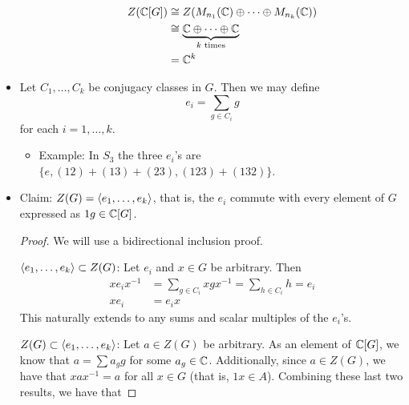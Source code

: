 \documentclass[../notes.tex]{subfiles}
\begin{document}
\begin{itemize}
\begin{itemize}
\begin{align*}
            Z(\mathbb{C}[G]) &\cong Z(M_{n_1}(\mathbb{C})\oplus\cdots\oplus M_{n_k}(\mathbb{C}))\\
            &\cong \underbrace{\mathbb{C}\oplus\cdots\oplus\mathbb{C}}_{k\text{ times}}\\
            &= \mathbb{C}^k
        \end{align*}
    \end{itemize}
    \item Let $C_1,\dots,C_k$ be conjugacy classes in $G$. Then we may define
    \begin{equation*}
        e_i = \sum_{g\in C_i}g
    \end{equation*}
    for each $i=1,\dots,k$.
    \begin{itemize}
        \item Example: In $S_3$ the three $e_i$'s are $\{e,(12)+(13)+(23),(123)+(132)\}$.
    \end{itemize}
    \item Claim: $Z(G)=\left\langle{e_1,\dots,e_k}\right\rangle$, that is, the $e_i$ commute with every element of $G$ expressed as $1g\in\mathbb{C}[G]$.
    \begin{proof}
        We will use a bidirectional inclusion proof.\par
        \underline{$\left\langle{e_1,\dots,e_k}\right\rangle\subset Z(G)$}: Let $e_i$ and $x\in G$ be arbitrary. Then
        \begin{align*}
            xe_ix^{-1} &= \sum_{g\in C_i}xgx^{-1} = \sum_{h\in C_i}h = e_i\\
            xe_i &= e_ix
        \end{align*}
        This naturally extends to any sums and scalar multiples of the $e_i$'s.\par
        \underline{$Z(G)\subset\left\langle{e_1,\dots,e_k}\right\rangle$}: Let $a\in Z(G)$ be arbitrary. As an element of $\mathbb{C}[G]$, we know that $a=\sum a_gg$ for some $a_g\in\mathbb{C}$. Additionally, since $a\in Z(G)$, we have that $xax^{-1}=a$ for all $x\in G$ (that is, $1x\in A$). Combining these last two results, we have that

\end{proof}
\end{itemize}
\end{document}
